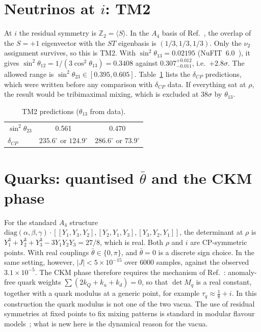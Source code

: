 \documentclass[aps,prd,twocolumn,superscriptaddress,nofootinbib,showkeys]{revtex4-2}
\begin{document}
\section{Neutrinos at $i$: TM2}
At $i$ the residual symmetry is $\mathbb Z_2=\langle S\rangle$. In the $A_4$ basis of Ref.~\cite{F17}, the overlap of the $S=+1$ eigenvector with the $ST$ eigenbasis is $(1/3,1/3,1/3)$. Only the $\nu_2$ assignment survives, so this is TM2. With $\sin^2\theta_{13}=0.02195$ (NuFIT~6.0~\cite{NuFIT}), it gives $\sin^2\theta_{12}=1/(3\cos^2\theta_{13})=0.3408$ against $0.307^{+0.012}_{-0.011}$, i.e.\ $+2.8\sigma$. The allowed range is $\sin^2\theta_{23}\in[0.395,0.605]$. Table~\ref{tab:d} lists the $\delta_{CP}$ predictions, which were written before any comparison with $\delta_{CP}$ data. If everything sat at $\rho$, the result would be tribimaximal mixing, which is excluded at $38\sigma$ by $\theta_{13}$.
\begin{table}[b]\caption{TM2 predictions ($\theta_{13}$ from data).}\label{tab:d}
\begin{ruledtabular}\begin{tabular}{lcc}
$\sin^2\theta_{23}$ & 0.561 & 0.470\\ $\delta_{CP}$ & $235.6^\circ$ or $124.9^\circ$ & $286.6^\circ$ or $73.9^\circ$\\
\end{tabular}\end{ruledtabular}\end{table}

\section{Quarks: quantised $\bar\theta$ and the CKM phase}
For the standard $A_4$ structure $\mathrm{diag}(\alpha,\beta,\gamma)\cdot[[Y_1,Y_3,Y_2],[Y_2,Y_1,Y_3],[Y_3,Y_2,Y_1]]$, the determinant at $\rho$ is $Y_1^3+Y_2^3+Y_3^3-3Y_1Y_2Y_3=27/8$, which is real. Both $\rho$ and $i$ are CP-symmetric points. With real couplings $\bar\theta\in\{0,\pi\}$, and $\bar\theta=0$ is a discrete sign choice. In the same setting, however, $|J|<5\times10^{-15}$ over $6000$ samples, against the observed $3.1\times10^{-5}$. The CKM phase therefore requires the mechanism of Ref.~\cite{FST}: anomaly-free quark weights $\sum(2k_Q+k_u+k_d)=0$, so that $\det M_q$ is a real constant, together with a quark modulus at a generic point, for example $\tau_q\approx\tfrac18+i$. In this construction the quark modulus is not one of the two vacua. The use of residual symmetries at fixed points to fix mixing patterns is standard in modular flavour models~\cite{NPP}; what is new here is the dynamical reason for the vacua.
\end{document}
